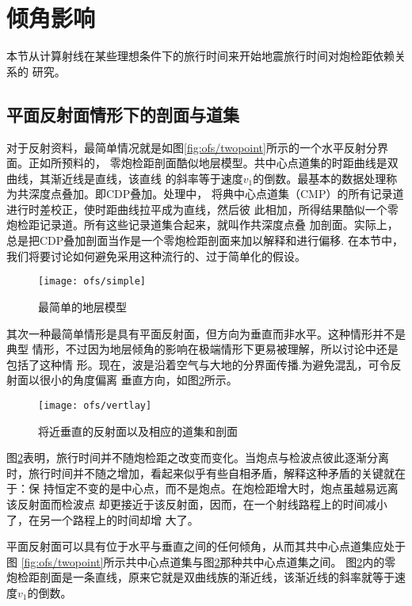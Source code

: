 \section{倾角影响}
\label{sec:3.2}

本节从计算射线在某些理想条件下的旅行时间来开始地震旅行时间对炮检距依赖关系的
研究。

\subsection{平面反射面情形下的剖面与道集}
\label{sec:3.2.1}

对于反射资料，最简单情况就是如图\ref{fig:ofs/twopoint}所示的一个水平反射分界面。正如所预料的，
零炮检距剖面酷似地层模型。共中心点道集的时距曲线是双曲线，其渐近线是直线，该直线
的斜率等于速度$v_1$的倒数。最基本的数据处理称为共深度点叠加。即CDP叠加。处理中，
将典中心点道集（CMP）的所有记录道进行时差校正，使时距曲线拉平成为直线，然后彼
此相加，所得结果酷似一个零炮检距记录道。所有这些记录道集合起来，就叫作共深度点叠
加剖面。实际上，总是把CDP叠加剖面当作是一个零炮检距剖面来加以解释和进行偏移.
在本节中，我们将要讨论如何避免采用这种流行的、过于简单化的假设。

\begin{figure}[H]
\centering
\texttt{[image: ofs/simple]}
\caption[simple]{最简单的地层模型}
\label{fig:ofs/simple}
\end{figure}

其次一种最简单情形是具有平面反射面，但方向为垂直而非水平。这种情形并不是典型
情形，不过因为地层倾角的影响在极端情形下更易被理解，所以讨论中还是包括了这种情
形。现在，波是沿着空气与大地的分界面传播.为避免混乱，可令反射面以很小的角度偏离
垂直方向，如图\ref{fig:ofs/vertlay}所示。

\begin{figure}[H]
\centering
\texttt{[image: ofs/vertlay]}
\caption[vertlay]{将近垂直的反射面以及相应的道集和剖面}
\label{fig:ofs/vertlay}
\end{figure}

图\ref{fig:ofs/vertlay}表明，旅行时间并不随炮检距之改变而变化。当炮点与检波点彼此逐渐分离
时，旅行时间并不随之增加，看起来似乎有些自相矛盾，解释这种矛盾的关键就在于：保
持恒定不变的是中心点，而不是炮点。在炮检距增大时，炮点虽越易远离该反射面而检波点
却更接近于该反射面，因而，在一个射线路程上的时间减小了，在另一个路程上的时间却增
大了。

平面反射面可以具有位于水平与垂直之间的任何倾角，从而其共中心点道集应处于图
\ref{fig:ofs/twopoint}所示共中心点道集与图\ref{fig:ofs/vertlay}那种共中心点道集之间。
图\ref{fig:ofs/vertlay}内的零炮检距剖面是一条直线，原来它就是双曲线族的渐近线，该渐近线的斜率就等于速度$v_1$的倒数。

